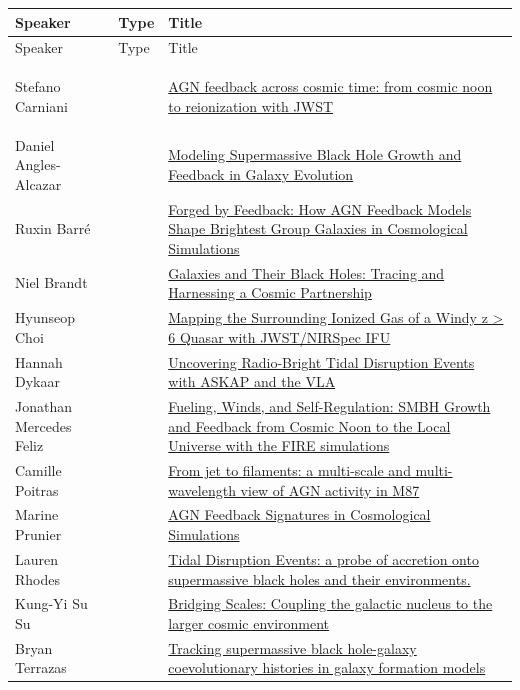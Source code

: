 {
\small
{}
\sloppy
\setlength{\emergencystretch}{1em}
\begin{longtable}{@{}>{\TableRaggedRight\arraybackslash\hspace{0pt}}p{} >{\centering\arraybackslash}p{} >{\TableRaggedRight\arraybackslash\hspace{0pt}}p{}@{}}
\toprule
Speaker & Type & Title \\
\midrule
\endfirsthead
\toprule
Speaker & Type & Title \\
\midrule
\endhead
\hypertarget{sched-2}{}Stefano Carniani & \invitedbadge{} & \hyperlink{abs-2}{AGN feedback across cosmic time: from cosmic noon to reionization with JWST} \\
\hypertarget{sched-7}{}Daniel Angles-Alcazar & \invitedbadge{} & \hyperlink{abs-7}{Modeling Supermassive Black Hole Growth and Feedback in Galaxy Evolution} \\
\hypertarget{sched-29}{}Ruxin Barré &  & \hyperlink{abs-29}{Forged by Feedback: How AGN Feedback Models Shape Brightest Group Galaxies in Cosmological Simulations} \\
\hypertarget{sched-30}{}Niel Brandt &  & \hyperlink{abs-30}{Galaxies and Their Black Holes: Tracing and Harnessing a Cosmic Partnership} \\
\hypertarget{sched-31}{}Hyunseop Choi &  & \hyperlink{abs-31}{Mapping the Surrounding Ionized Gas of a Windy z > 6 Quasar with JWST/NIRSpec IFU} \\
\hypertarget{sched-32}{}Hannah Dykaar &  & \hyperlink{abs-32}{Uncovering Radio-Bright Tidal Disruption Events with ASKAP and the VLA} \\
\hypertarget{sched-37}{}Jonathan Mercedes Feliz &  & \hyperlink{abs-37}{Fueling, Winds, and Self-Regulation: SMBH Growth and Feedback from Cosmic Noon to the Local Universe with the FIRE simulations} \\
\hypertarget{sched-43}{}Camille Poitras &  & \hyperlink{abs-43}{From jet to filaments: a multi-scale and multi-wavelength view of AGN activity in M87} \\
\hypertarget{sched-44}{}Marine Prunier &  & \hyperlink{abs-44}{AGN Feedback Signatures in Cosmological Simulations} \\
\hypertarget{sched-45}{}Lauren Rhodes &  & \hyperlink{abs-45}{Tidal Disruption Events: a probe of accretion onto supermassive black holes and their environments.} \\
\hypertarget{sched-46}{}Kung-Yi Su Su &  & \hyperlink{abs-46}{Bridging Scales: Coupling the galactic nucleus to the larger cosmic environment} \\
\hypertarget{sched-47}{}Bryan Terrazas &  & \hyperlink{abs-47}{Tracking supermassive black hole-galaxy coevolutionary histories in galaxy formation models} \\
\bottomrule
\end{longtable}
}

